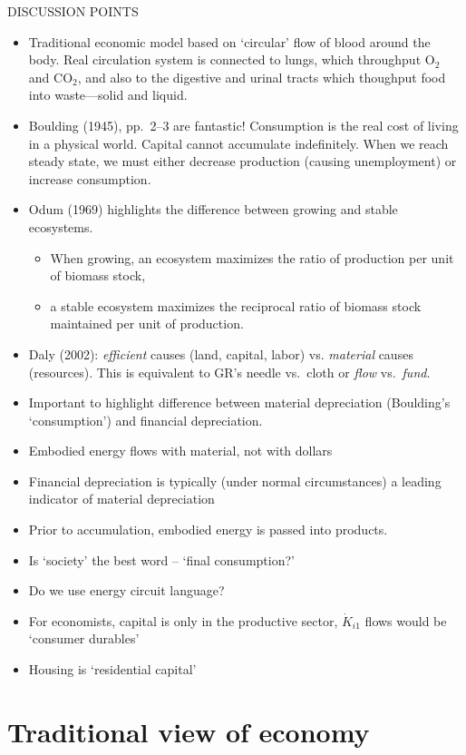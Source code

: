 DISCUSSION POINTS
\begin{itemize}
	\item{Traditional economic model based on `circular' flow of blood around the body. 
	Real circulation system is connected to lungs, which throughput O$_2$ and CO$_2$, 
	and also to the digestive and urinal tracts which thoughput food into waste---solid and liquid.}
	\item{Boulding (1945)\cite{Boulding1945}, pp.\ 2--3 are fantastic! Consumption is the real cost of living in a physical
	world. Capital cannot accumulate indefinitely.
	When we reach steady state, we must either decrease production (causing unemployment)
	or increase consumption.}
	\item{Odum (1969)\cite{Odum1969} highlights the difference between growing and stable ecosystems.}
		\begin{itemize}
			\item{When growing, an ecosystem maximizes the ratio of production per unit 
			of biomass stock,}
			\item{a stable ecosystem maximizes the reciprocal ratio of biomass stock 
			maintained per unit of production.}
		\end{itemize}
	\item{Daly (2002)\cite{Daly2002}: \emph{efficient} causes (land, capital, labor) vs. \emph{material} causes (resources).
	This is equivalent to GR's needle vs.\ cloth or \emph{flow} vs.\ \emph{fund}.}
	\item{Important to highlight difference between material depreciation (Boulding's `consumption') and financial depreciation.}
	\item{Embodied energy flows with material, not with dollars}
	\item{Financial depreciation is typically (under normal circumstances) a leading indicator of material depreciation}
	\item{Prior to accumulation, embodied energy is passed into products.}
	\item{Is `society' the best word – `final consumption?'}
	\item{Do we use energy circuit language?}
	\item{For economists, capital is only in the productive sector, $\dot{K}_{i1}$ flows would be `consumer durables'}
	\item{Housing is `residential capital'}
\end{itemize}

\section{Traditional view of economy}

